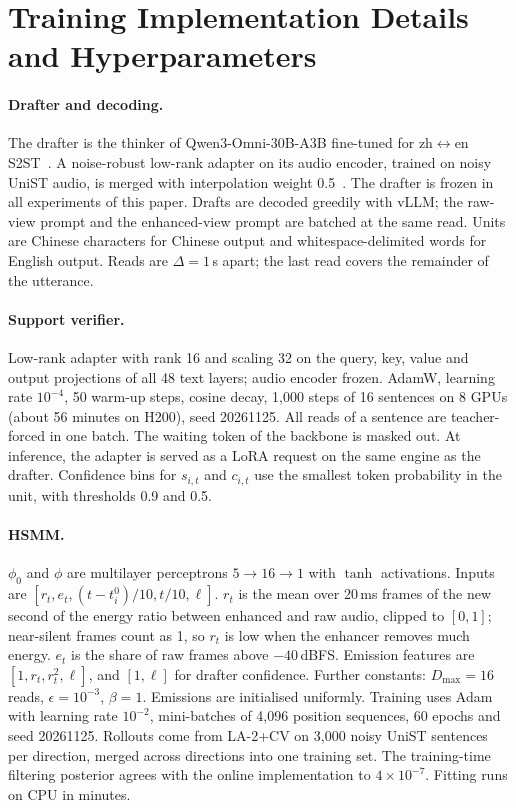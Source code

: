 \section{Training Implementation Details and Hyperparameters}
\label{app:hparams}

\paragraph{Drafter and decoding.}
The drafter is the thinker of Qwen3-Omni-30B-A3B fine-tuned for zh$\leftrightarrow$en S2ST~\citep{uniss2025}.
A noise-robust low-rank adapter on its audio encoder, trained on noisy UniST audio, is merged with interpolation weight 0.5~\citep{wortsman2022robust}.
The drafter is frozen in all experiments of this paper.
Drafts are decoded greedily with vLLM; the raw-view prompt and the enhanced-view prompt are batched at the same read.
Units are Chinese characters for Chinese output and whitespace-delimited words for English output.
Reads are $\Delta = 1$\,s apart; the last read covers the remainder of the utterance.

\paragraph{Support verifier.}
Low-rank adapter with rank 16 and scaling 32 on the query, key, value and output projections of all 48 text layers; audio encoder frozen.
AdamW, learning rate $10^{-4}$, 50 warm-up steps, cosine decay, 1{,}000 steps of 16 sentences on 8 GPUs (about 56 minutes on H200), seed 20261125.
All reads of a sentence are teacher-forced in one batch.
The waiting token of the backbone is masked out.
At inference, the adapter is served as a LoRA request on the same engine as the drafter.
Confidence bins for $s_{i,t}$ and $c_{i,t}$ use the smallest token probability in the unit, with thresholds 0.9 and 0.5.

\paragraph{HSMM.}
$\phi_0$ and $\phi$ are multilayer perceptrons $5 \rightarrow 16 \rightarrow 1$ with $\tanh$ activations.
Inputs are $[r_t, e_t, (t - t^0_i)/10, t/10, \ell]$.
$r_t$ is the mean over 20\,ms frames of the new second of the energy ratio between enhanced and raw audio, clipped to $[0,1]$; near-silent frames count as 1, so $r_t$ is low when the enhancer removes much energy.
$e_t$ is the share of raw frames above $-40$\,dBFS.
Emission features are $[1, r_t, r_t^2, \ell]$, and $[1, \ell]$ for drafter confidence.
Further constants: $D_{\max} = 16$ reads, $\epsilon = 10^{-3}$, $\beta = 1$.
Emissions are initialised uniformly.
Training uses Adam with learning rate $10^{-2}$, mini-batches of 4{,}096 position sequences, 60 epochs and seed 20261125.
Rollouts come from LA-2+CV on 3{,}000 noisy UniST sentences per direction, merged across directions into one training set.
The training-time filtering posterior agrees with the online implementation to $4 \times 10^{-7}$.
Fitting runs on CPU in minutes.

